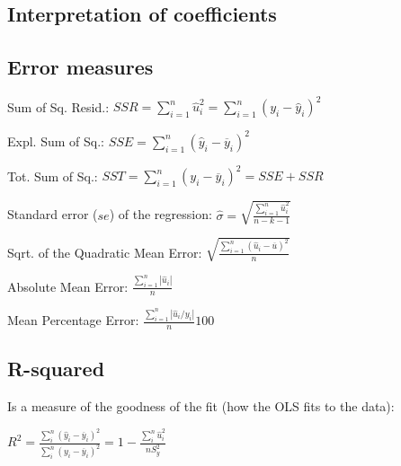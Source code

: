 \documentclass[10pt, a4paper, landscape]{extarticle}
\begin{document}
\begin{multicols}{3}
\subsection*{Interpretation of coefficients}


\subsection*{Error measures}

Sum of Sq. Resid.: $SSR = \sum_{i=1}^n \hat{u}_i^2 = \sum_{i=1}^n (y_i - \hat{y}_i)^2$

Expl. Sum of Sq.: $SSE = \sum_{i=1}^n (\hat{y}_i - \overline{y}_i)^2$

Tot. Sum of Sq.: $SST = \sum_{i=1}^n (y_i - \overline{y}_i)^2 = SSE + SSR$

Standard error ($se$) of the regression: $\hat{\sigma} = \sqrt{\frac{\sum_{i=1}^n \hat{u}_i^2}{n-k-1}}$

Sqrt. of the Quadratic Mean Error: $\sqrt{\frac{\sum_{i=1}^n (\hat{u}_i - \overline{u})^2}{n}}$

Absolute Mean Error: $\frac{\sum_{i=1}^n |\hat{u}_i|}{n}$

Mean Percentage Error: $\frac{\sum_{i=1}^n |\hat{u}_i / y_i|}{n} 100$

\columnbreak

\subsection*{R-squared}

Is a measure of the goodness of the fit (how the OLS fits to the data):

$R^2 = \frac{\sum_i^n (\hat{y}_i - \overline{y}_i)^2}{\sum_i^n (y_i - \overline{y}_i)^2} = 1 - \frac{\sum_i^n \hat{u}_i^2}{nS_y^2}$


\end{multicols}
\end{document}
